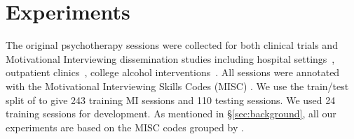 \section{Experiments}
\label{sec:misc:experiments}

 The original psychotherapy sessions were collected for both clinical trials and Motivational Interviewing dissemination studies including hospital
settings~\cite{roy2014brief}, outpatient
clinics~\cite{baer2009agency}, college alcohol
interventions~\cite{tollison2008questions, neighbors2012randomized,
  lee2013indicated, lee2014randomized}.  All sessions were annotated with the Motivational Interviewing Skills Codes (MISC) \cite{atkins2014scaling}.    We use the train/test split
of \citet{can2015dialog, tanana2016comparison} to give 243 training MI
sessions and 110 testing sessions. We used 24 training sessions for
development.
As mentioned in \S\ref{sec:background}, all our experiments are
based on the MISC codes grouped by \citet{xiao2016behavioral}.





